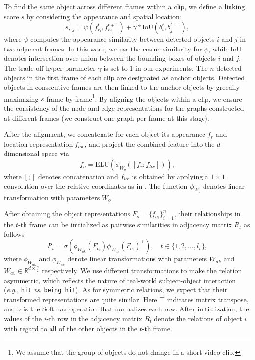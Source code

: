 \documentclass[10pt,journal,compsoc]{IEEEtran}
\newcommand{\vs}{\textit{vs}. }
\newcommand{\eg}{\textit{e}.\textit{g}.}
\begin{document}
To find the same object across different frames within a clip, we define a linking score $s$ by considering the appearance and spatial location:
\begin{equation}
    s_{i, j} =  \psi(f_{r_i}^t, f_{r_j}^{t+1}) + \gamma*\text{IoU}(b_i^t, b_j^{t+1}),
\end{equation}
where $\psi$ computes the appearance similarity between detected objects $i$ and $j$ in two adjacent frames.  In this work, we use the cosine similarity for $\psi$, while IoU denotes intersection-over-union between the bounding boxes of objects $i$ and $j$. The trade-off hyper-parameter $\gamma$ is set to 1 in our experiments. The $n$ detected objects in the first frame of each clip are designated as anchor objects. Detected objects in consecutive frames are then linked to the anchor objects by greedily maximizing $s$ frame by frame\footnote{We assume that the group of objects do not change in a short video clip.}. By aligning the objects within a clip, we ensure the consistency of the node and edge representations for the graphs constructed at different frames (we construct one graph per frame at this stage).

After the alignment, we concatenate for each object its appearance $f_r$ and location representation $f_{loc}$, and project the combined feature into the $d$-dimensional space via 
\begin{equation}
\label{equ:fo}
    f_o = \mathrm{ELU}(\phi_{W_o}([f_r;f_{loc}])),
\end{equation}
where $[;]$ denotes concatenation and $f_{loc}$ is obtained by applying a $1 \times 1$ convolution over the relative coordinates as in \cite{xiao2021video}. The function $\phi_{W_o}$ denotes linear transformation with parameters $W_o$. 

After obtaining the object representations $F_o\!=\!\{f_{o_i}\}_{i=1}^n$, their relationships in the $t$-th frame can be initialized as pairwise similarities in adjacency matrix $R_t$ as follows
\begin{equation}
\label{equ:aa}
    R_t = \sigma(\phi_{W_{ak}}(F_{o_t})\phi_{W_{av}}(F_{o_t})^\mathrm{\intercal}), \quad t\in\{1, 2, \dots, l_v\},
\end{equation}
where $\phi_{W_{ak}}$ and $\phi_{W_{av}}$ denote linear transformations with parameters $W_{ak}$ and $W_{av} \in \mathbb{R}^{d \times \frac{d}{2}}$ respectively. We use different transformations to make the relation asymmetric, which reflects the nature of real-world subject-object interaction \cite{xiao2020visual,krishna2018referring} (\eg, \texttt{hit} \vs \texttt{being hit}). As for symmetric relations, we expect that their transformed representations are quite similar. Here $\mathrm{\intercal}$ indicates matrix transpose, and $\sigma$ is the Softmax operation that normalizes each row. After initialization, the values of the $i$-th row in the adjacency matrix $R_t$ denote the relations of object $i$ with regard to all of the other objects in the $t$-th frame. 
\end{document}
